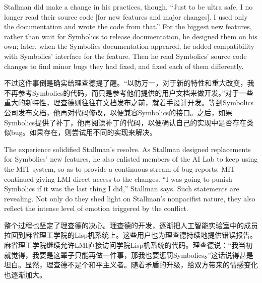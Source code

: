 \ifdefined\eng
Stallman did make a change in his practices, though.  ``Just to be ultra safe, I no longer read their source code [for new features and major changes]. I used only the documentation and wrote the code from that.''  For the biggest new features, rather than wait for Symbolics to release documentation, he designed them on his own; later, when the Symbolics documentation appeared, he added compatibility with Symbolics' interface for the feature.  Then he read Symbolics' source code changes to find minor bugs they had fixed, and fixed each of them differently.
\fi

\ifdefined\chs
不过这件事倒是确实给理查德提了醒。``以防万一，对于新的特性和重大改变，我不再参考Symbolics的代码，而只是参考他们提供的用户文档来做开发。''对于一些重大的新特性，理查德则往往在文档发布之前，就着手设计开发。等到Symbolics公司发布文档，他再对代码修改，以便兼容Symbolics的接口。之后，如果Symbolics提供了补丁，他再阅读补丁的代码，以便确认自己的实现中是否存在类似bug。如果存在，则尝试用不同的实现来解决。
\fi

\ifdefined\eng
The experience solidified Stallman's resolve. As Stallman designed replacements for Symbolics' new features, he also enlisted members of the AI Lab to keep using the MIT system, so as to provide a continuous stream of bug reports. MIT continued giving LMI direct access to the changes. ``I was going to punish Symbolics if it was the last thing I did,'' Stallman says.  Such statements are revealing. Not only do they shed light on Stallman's nonpacifist nature, they also reflect the intense level of emotion triggered by the conflict.
\fi

\ifdefined\chs
整个过程也坚定了理查德的决心。理查德的开发，逐渐把人工智能实验室中的成员拉回到麻省理工学院的Lisp机系统上。这些用户也为理查德持续地提供错误报告。麻省理工学院继续允许LMI直接访问学院Lisp机系统的代码。理查德说：``我当初就觉得，我要是这辈子只能再做一件事，那我也要惩罚Symbolics。''这话说得甚是坦白。显然，理查德不是个和平主义者。随着矛盾的升级，给双方带来的情感变化也逐渐加大。
\fi

